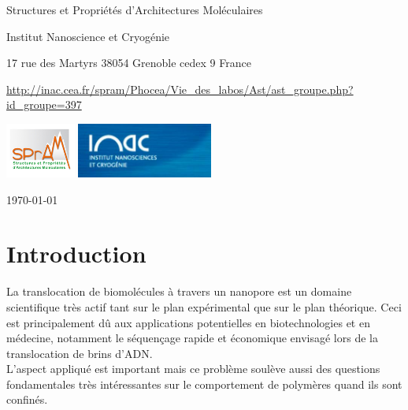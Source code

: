 \documentclass[a4paper,11pt]{article}
\begin{document}
\begin{center}
{Structures et Propriétés d'Architectures Moléculaires

Institut Nanoscience et Cryogénie
{\it 

17 rue des Martyrs
38054 Grenoble cedex 9
France}

\url{http://inac.cea.fr/spram/Phocea/Vie_des_labos/Ast/ast_groupe.php?id_groupe=397}
} %

\vspace{1cm}


\includegraphics[height=1.8cm]{spram.jpg} \hspace{0.3cm}
\includegraphics[height=1.8cm]{inac.jpg}

\end{center}

\begin{flushright}
\today
\end{flushright}

\vfill
\hfill 




\setlength{\parindent}{10pt}



\section*{Introduction}


La translocation de biomolécules à travers un nanopore est un domaine scientifique très actif tant sur le plan expérimental que sur le plan théorique. Ceci est principalement dû aux applications potentielles en biotechnologies et en médecine, notamment le séquençage rapide et économique envisagé lors de la translocation de brins d'ADN.\\

L'aspect appliqué est important mais ce problème soulève aussi des questions fondamentales très intéressantes sur le comportement de polymères quand ils sont confinés.\\
\end{document}
